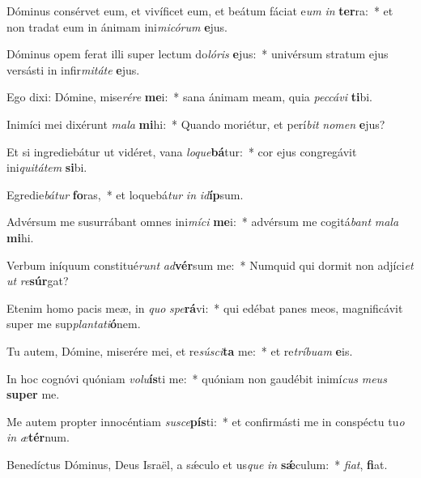 \item Dóminus consérvet eum, et vivíficet eum, et beátum fáciat e\textit{um} \textit{in} \textbf{ter}ra:~* et non tradat eum in ánimam ini\textit{mi}\textit{có}\textit{rum} \textbf{e}jus.
\item Dóminus opem ferat illi super lectum do\textit{ló}\textit{ris} \textbf{e}jus:~* univérsum stratum ejus versásti in infir\textit{mi}\textit{tá}\textit{te} \textbf{e}jus.
\item Ego dixi: Dómine, mise\textit{ré}\textit{re} \textbf{me}i:~* sana ánimam meam, quia \textit{pec}\textit{cá}\textit{vi} \textbf{ti}bi.
\item Inimíci mei dixérunt \textit{ma}\textit{la} \textbf{mi}hi:~* Quando moriétur, et perí\textit{bit} \textit{no}\textit{men} \textbf{e}jus?
\item Et si ingrediebátur ut vidéret, vana \textit{lo}\textit{que}\textbf{bá}tur:~* cor ejus congregávit ini\textit{qui}\textit{tá}\textit{tem} \textbf{si}bi.
\item Egredie\textit{bá}\textit{tur} \textbf{fo}ras,~* et loquebá\textit{tur} \textit{in} \textit{id}\textbf{íp}sum.
\item Advérsum me susurrábant omnes ini\textit{mí}\textit{ci} \textbf{me}i:~* advérsum me cogitá\textit{bant} \textit{ma}\textit{la} \textbf{mi}hi.
\item Verbum iníquum constitué\textit{runt} \textit{ad}\textbf{vér}sum me:~* Numquid qui dormit non adjíci\textit{et} \textit{ut} \textit{re}\textbf{súr}gat?
\item Etenim homo pacis meæ, in \textit{quo} \textit{spe}\textbf{rá}vi:~* qui edébat panes meos, magnificávit super me sup\textit{plan}\textit{ta}\textit{ti}\textbf{ó}nem.
\item Tu autem, Dómine, miserére mei, et re\textit{sú}\textit{sci}\textbf{ta} me:~* et re\textit{trí}\textit{bu}\textit{am} \textbf{e}is.
\item In hoc cognóvi quóniam \textit{vo}\textit{lu}\textbf{ís}ti me:~* quóniam non gaudébit inimí\textit{cus} \textit{me}\textit{us} \textbf{su}\textbf{per} me.
\item Me autem propter innocéntiam \textit{su}\textit{sce}\textbf{pís}ti:~* et confirmásti me in conspéctu tu\textit{o} \textit{in} \textit{æ}\textbf{tér}num.
\item Benedíctus Dóminus, Deus Israël, a sǽculo et us\textit{que} \textit{in} \textbf{sǽ}culum:~* \textit{fi}\textit{at}, \textbf{fi}at.
